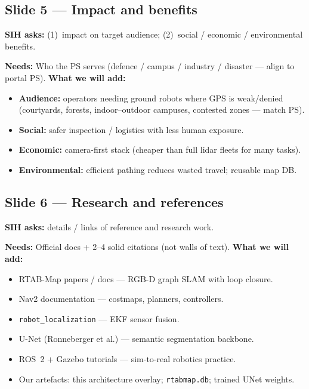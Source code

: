 \documentclass[11pt,a4paper]{article}
\newcommand{\needs}[1]{\textbf{Needs:} #1}
\begin{document}
\subsection{Slide 5 --- Impact and benefits}

\textbf{SIH asks:}
(1)~impact on target audience;
(2)~social / economic / environmental benefits.

\needs{Who the PS serves (defence / campus / industry / disaster --- align to portal PS).}
\textbf{What we will add:}
\begin{itemize}[nosep,leftmargin=*]
  \item \textbf{Audience:} operators needing ground robots where GPS is weak/denied
        (courtyards, forests, indoor--outdoor campuses, contested zones --- match PS).
  \item \textbf{Social:} safer inspection / logistics with less human exposure.
  \item \textbf{Economic:} camera-first stack (cheaper than full lidar fleets for many tasks).
  \item \textbf{Environmental:} efficient pathing reduces wasted travel; reusable map DB.
\end{itemize}

\subsection{Slide 6 --- Research and references}

\textbf{SIH asks:} details / links of reference and research work.

\needs{Official docs + 2--4 solid citations (not walls of text).}
\textbf{What we will add:}
\begin{itemize}[nosep,leftmargin=*]
  \item RTAB-Map papers / docs --- RGB-D graph SLAM with loop closure.
  \item Nav2 documentation --- costmaps, planners, controllers.
  \item \texttt{robot\_localization} --- EKF sensor fusion.
  \item U-Net (Ronneberger et al.) --- semantic segmentation backbone.
  \item ROS~2 + Gazebo tutorials --- sim-to-real robotics practice.
  \item Our artefacts: this architecture overlay; \texttt{rtabmap.db}; trained UNet weights.
\end{itemize}
\end{document}
